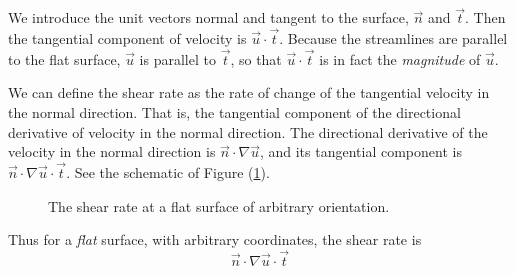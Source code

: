 \documentclass[12pt, a4paper, twoside, openright]{book}
\begin{document}
We introduce the unit vectors normal and tangent to the surface, $\vec{n}$ and $\vec{t}$. Then the tangential component of velocity is $ \vec{u} \cdot \vec{t}$.  
Because the streamlines are parallel to the flat surface, $\vec{u}$ is parallel to $\vec{t}$, so that $\vec{u} \cdot \vec{t}$ is in fact the \emph{magnitude} of $\vec{u}$.

We can define the shear rate as the rate of change of the tangential velocity in the normal direction. That is, the tangential component of the directional derivative of velocity in the normal direction.
The directional derivative of the velocity in the normal direction is $ \vec{n} \cdot \nabla \vec{u} $, and its tangential component is $ \vec{n} \cdot \nabla \vec{u} \cdot \vec{t}$.  See the schematic of Figure (\ref{flatshearrate}).

\begin{figure}[ht]
\centering
{}
\caption{The shear rate at a flat surface of arbitrary orientation.}\label{flatshearrate}
\end{figure}

Thus for a \emph{flat} surface, with arbitrary coordinates, the shear rate is
\begin{equation}
\vec{n} \cdot \nabla \vec{u} \cdot \vec{t}
\end{equation}
\end{document}
